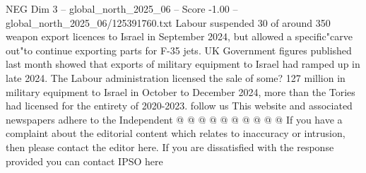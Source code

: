 \begin{textsample}{NEG Dim 3 – global\_north\_2025\_06 – Score -1.00 – global\_north\_2025\_06/125391760.txt}
Labour suspended 30 of around 350 weapon export licences to Israel in September 2024, but allowed a specific"carve out"to continue exporting parts for F-35 jets.
UK Government figures published last month showed that exports of military equipment to Israel had ramped up in late 2024.
The Labour administration licensed the sale of some? 127 million in military equipment to Israel in October to December 2024, more than the Tories had licensed for the entirety of 2020-2023. follow us This website and associated newspapers adhere to the Independent @ @ @ @ @ @ @ @ @ @ If you have a complaint about the editorial content which relates to inaccuracy or intrusion, then please contact the editor here.
If you are dissatisfied with the response provided you can contact IPSO here

\end{textsample}

